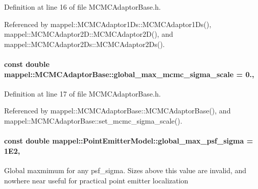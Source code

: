 Definition at line 16 of file M\+C\+M\+C\+Adaptor\+Base.\+h.



Referenced by mappel\+::\+M\+C\+M\+C\+Adaptor1\+Ds\+::\+M\+C\+M\+C\+Adaptor1\+Ds(), mappel\+::\+M\+C\+M\+C\+Adaptor2\+D\+::\+M\+C\+M\+C\+Adaptor2\+D(), and mappel\+::\+M\+C\+M\+C\+Adaptor2\+Ds\+::\+M\+C\+M\+C\+Adaptor2\+Ds().

\paragraph[{\texorpdfstring{global\+\_\+max\+\_\+mcmc\+\_\+sigma\+\_\+scale}{global_max_mcmc_sigma_scale}}]{\setlength{\rightskip}{0pt plus 5cm}const double mappel\+::\+M\+C\+M\+C\+Adaptor\+Base\+::global\+\_\+max\+\_\+mcmc\+\_\+sigma\+\_\+scale = 0.\hspace{0.3cm}{\ttfamily [static]}, {\ttfamily [inherited]}}\hypertarget{classmappel_1_1MCMCAdaptorBase_aebc93881ca351e67de867238a62579eb}{}\label{classmappel_1_1MCMCAdaptorBase_aebc93881ca351e67de867238a62579eb}


Definition at line 17 of file M\+C\+M\+C\+Adaptor\+Base.\+h.



Referenced by mappel\+::\+M\+C\+M\+C\+Adaptor\+Base\+::\+M\+C\+M\+C\+Adaptor\+Base(), and mappel\+::\+M\+C\+M\+C\+Adaptor\+Base\+::set\+\_\+mcmc\+\_\+sigma\+\_\+scale().

\paragraph[{\texorpdfstring{global\+\_\+max\+\_\+psf\+\_\+sigma}{global_max_psf_sigma}}]{\setlength{\rightskip}{0pt plus 5cm}const double mappel\+::\+Point\+Emitter\+Model\+::global\+\_\+max\+\_\+psf\+\_\+sigma = 1\+E2\hspace{0.3cm}{\ttfamily [static]}, {\ttfamily [inherited]}}\hypertarget{classmappel_1_1PointEmitterModel_a5e79dba8966c25c4e9c675cd1a2cab70}{}\label{classmappel_1_1PointEmitterModel_a5e79dba8966c25c4e9c675cd1a2cab70}
Global maxmimum for any psf\+\_\+sigma. Sizes above this value are invalid, and nowhere near useful for practical point emitter localization 

